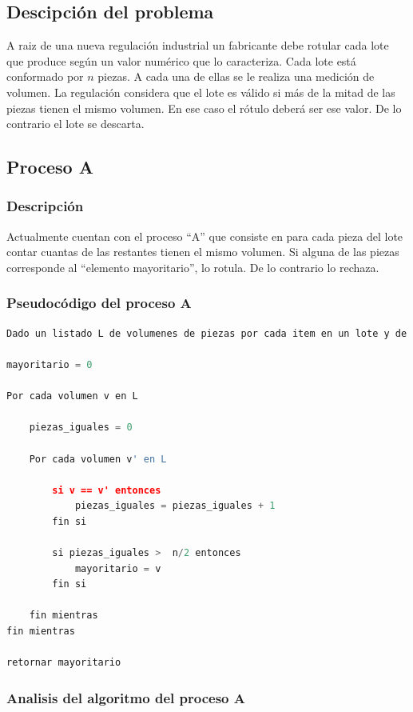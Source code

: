 \documentclass{article}
\begin{document}
\subsection{Descipción del problema}
A raiz de una nueva regulación industrial un fabricante debe rotular cada lote que produce según un valor numérico que lo caracteriza. 
Cada lote está conformado por \(n\) piezas. A cada una de ellas se le realiza una medición de volumen. La regulación considera que el lote es válido si más de la mitad de las piezas tienen el mismo volumen. 
En ese caso el rótulo deberá ser ese valor. De lo contrario el lote se descarta.

\subsection{Proceso A}

\subsubsection{Descripción}
Actualmente cuentan con el proceso “A” que consiste en para cada pieza del lote contar cuantas de las restantes tienen el mismo volumen. 
Si alguna de las piezas corresponde al “elemento mayoritario”, lo rotula. De lo contrario lo rechaza.

\newpage
\subsubsection{Pseudocódigo del proceso A}

\begin{lstlisting}[language=Python, caption=Algoritmo del proceso A]
Dado un listado L de volumenes de piezas por cada item en un lote y de n elementos.

mayoritario = 0

Por cada volumen v en L
    
    piezas_iguales = 0

    Por cada volumen v' en L

        si v == v' entonces 
            piezas_iguales = piezas_iguales + 1
        fin si

        si piezas_iguales >  n/2 entonces
            mayoritario = v
        fin si

    fin mientras
fin mientras

retornar mayoritario

\end{lstlisting}

\subsubsection{Analisis del algoritmo del proceso A}
\end{document}

